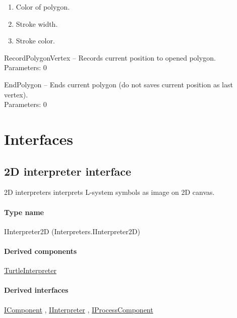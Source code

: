 \begin{description*}
			\begin{enumerate}
				\item
Color of polygon.				\item
            Stroke width.				\item
            Stroke color.			\end{enumerate}
		\item[RecordPolygonVertex]
			-- Records current position to opened polygon.
		\\ Parameters: 0 
		\item[EndPolygon]
			-- Ends current polygon (do not saves current position as last vertex).
		\\ Parameters: 0 
	\end{description*}


\section{Interfaces}

	

\subsection{2D interpreter interface}
\label{Malsys.Processing.Components.Interpreters.IInterpreter2D}
2D interpreters interprets L-system symbols as image on 2D canvas.\paragraph{Type name}
IInterpreter2D (Interpreters.IInterpreter2D) 	\paragraph{Derived components}
		\hyperref[Malsys.Processing.Components.Interpreters.TurtleInterpreter]{TurtleInterpreter}%
	\paragraph{Derived interfaces}
		\hyperref[Malsys.Processing.Components.IComponent]{IComponent}%
, 		\hyperref[Malsys.Processing.Components.IInterpreter]{IInterpreter}%
, 		\hyperref[Malsys.Processing.Components.IProcessComponent]{IProcessComponent}%
